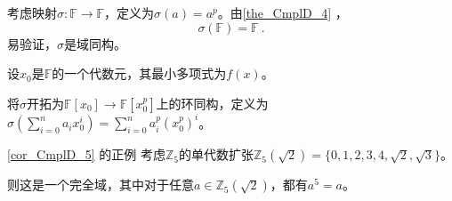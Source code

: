 

考虑映射$\sigma:\mathbb{F}\to\mathbb{F}$，定义为$\sigma(a)=a^p$。由\autoref{the_CmplD_4} ，
\begin{equation}
\sigma(\mathbb{F})=\mathbb{F}~.
\end{equation}
易验证，$\sigma$是域同构。

设$x_0$是$\mathbb{F}$的一个代数元，其最小多项式为$f(x)$。

将$\sigma$开拓为$\mathbb{F}[x_0]\to\mathbb{F}[x_0^p]$上的环同构，定义为$\sigma(\sum_{i=0}^n a_ix_0^i)=\sum_{i=0}^n a_i^p(x_0^p)^{i}$。





\begin{example}{\autoref{cor_CmplD_5} 的正例}
考虑$\mathbb{Z}_5$的单代数扩张$\mathbb{Z}_5(\sqrt{2})=\{0, 1, 2, 3, 4, \sqrt{2}, \sqrt{3}\}$。

则这是一个完全域，其中对于任意$a\in\mathbb{Z}_5(\sqrt{2})$，都有$a^5=a$。
\end{example}












